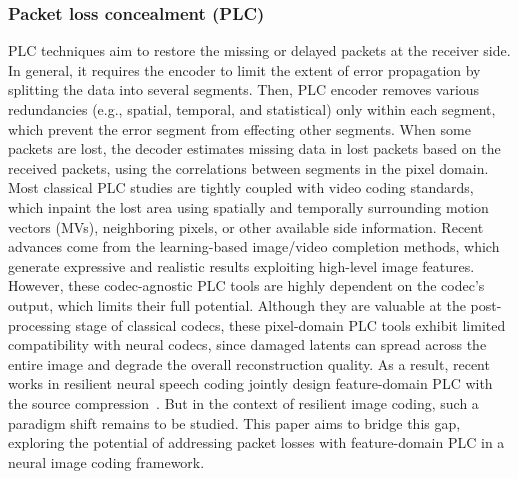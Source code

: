     \subsubsection{Packet loss concealment (PLC)}
    PLC techniques aim to restore the missing or delayed packets at the receiver side.
    In general, it requires the encoder to limit the extent of error propagation by splitting the data into several segments.
    Then, PLC encoder removes various redundancies (e.g., spatial, temporal, and statistical) only within each segment, which prevent the error segment from effecting other segments.
    When some packets are lost, the decoder estimates missing data in lost packets based on the received packets, using the correlations between segments in the pixel domain.
    Most classical PLC studies are tightly coupled with video coding standards, which inpaint the lost area using spatially and temporally surrounding motion vectors (MVs), neighboring pixels, or other available side information.
    Recent advances come from the learning-based image/video completion methods, which generate expressive and realistic results exploiting high-level image features.
    However, these codec-agnostic PLC tools are highly dependent on the codec's output, which limits their full potential.
    Although they are valuable at the post-processing stage of classical codecs, these pixel-domain PLC tools exhibit limited compatibility with neural codecs, since damaged latents can spread across the entire image and degrade the overall reconstruction quality.
    As a result, recent works in resilient neural speech coding jointly design feature-domain PLC with the source compression~\cite{msra_plc}.
    But in the context of resilient image coding, such a paradigm shift remains to be studied.
    This paper aims to bridge this gap, exploring the potential of addressing packet losses with feature-domain PLC in a neural image coding framework.

